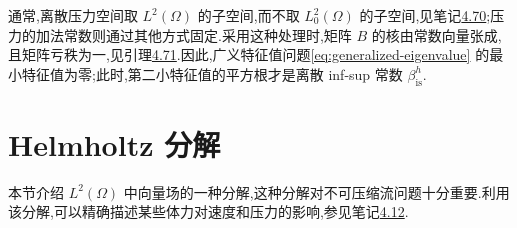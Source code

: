 \begin{note}[实际计算中的一个问题]\label{note:discrete-infsup-practical}
通常,离散压力空间取 $L^2(\Omega)$ 的子空间,而不取 $L_0^2(\Omega)$ 的子空间,见笔记\hyperref[note:pressure-space-l2]{4.70};压力的加法常数则通过其他方式固定.采用这种处理时,矩阵 $B$ 的核由常数向量张成,且矩阵亏秩为一,见引理\hyperref[lem:constant-pressure-kernel]{4.71}.因此,广义特征值问题\cref{eq:generalized-eigenvalue} 的最小特征值为零;此时,第二小特征值的平方根才是离散 inf-sup 常数 $\beta_{\mathrm{is}}^h$.
\end{note}

\section{Helmholtz 分解}\label{sec:helmholtz-decomposition}

\begin{note}[本节内容]\label{note:helmholtz-contents}
本节介绍 $L^2(\Omega)$ 中向量场的一种分解,这种分解对不可压缩流问题十分重要.利用该分解,可以精确描述某些体力对速度和压力的影响,参见笔记\hyperref[note:force-on-velocity-pressure]{4.12}.
\end{note}

